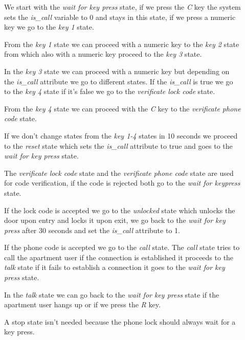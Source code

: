 \documentclass[11pt,a4paper]{article}
\begin{document}
\begin{description}
    \item[]
    We start with the \emph{wait for key press} state, if we press the \emph{C} key the system
    sets the \emph{is\_call} variable to 0 and stays in this state, 
    if we press a numeric key we go to the \emph{key 1} state.
    \item[]
    From the \emph{key 1} state we can proceed with a numeric key
    to the \emph{key 2} state from which also with a 
    numeric key proceed to the \emph{key 3} state.
    \item[]
    In the \emph{key 3} state we can proceed with a numeric key but depending on the
    \emph{is\_call} attribute we go to different states. If the \emph{is\_call} is true
    we go to the \emph{key 4} state if it's false we go to the \emph{verificate lock code}
    state.
    \item[]
    From the \emph{key 4} state we can proceed with the \emph{C} key 
    to the \emph{verificate phone code} state.
    \item[]
    If we don't change states from the \emph{key 1-4} states in 10 seconds 
    we proceed to the \emph{reset} state which sets the \emph{is\_call} attribute
    to true and goes to the \emph{wait for key press} state.
    \item[]
    The \emph{verificate lock code} state and the \emph{verificate phone code} state
    are used for code verification, if the code is rejected both go to the 
    \emph{wait for keypress} state.
    \item[]
    If the lock code is accepted we go to the \emph{unlocked} state which unlocks the
    door upon entry and locks it upon exit, we go back to the \emph{wait for key press}
    after 30 seconds and set the \emph{is\_call} attribute to 1.
    \item[]
    If the phone code is accepted we go to the \emph{call} state. The \emph{call} state
    tries to call the apartment user if the connection is established it proceeds to the
    \emph{talk} state if it fails to establish a connection it goes to the 
    \emph{wait for key press} state.
    \item[]
    In the \emph{talk} state we can go back to the \emph{wait for key press} state
    if the apartment user hangs up or if we press the \emph{R} key.
    \item[]
    A stop state isn't needed because the phone lock should always wait for a key press.
\end{description}
\end{document}
